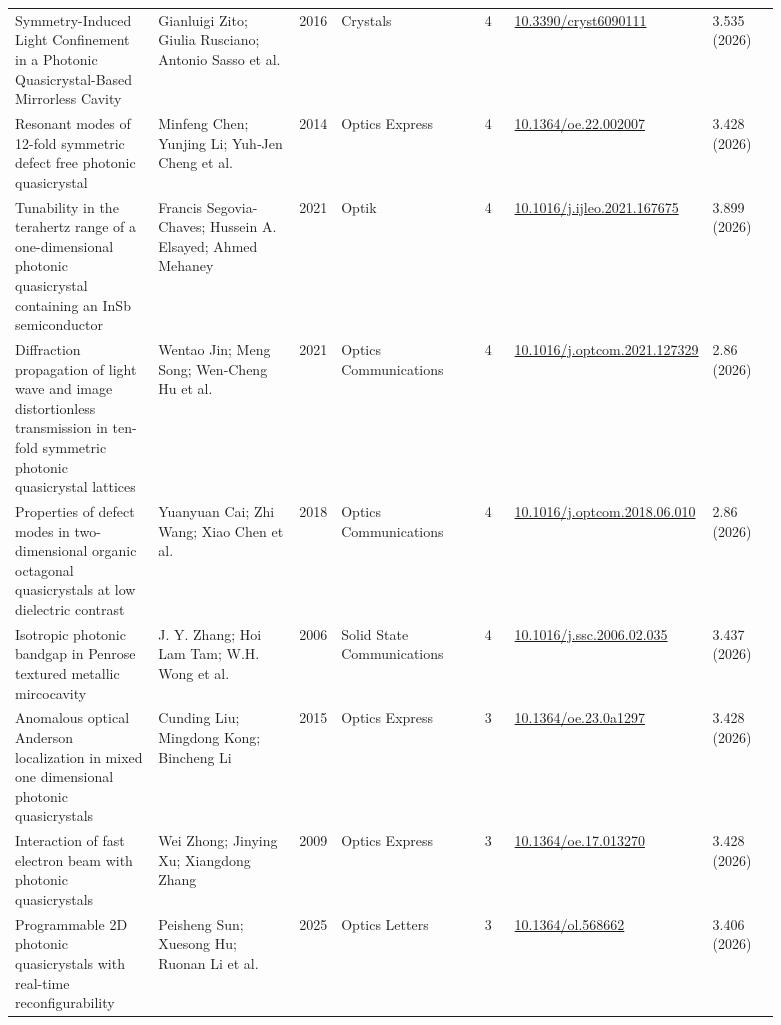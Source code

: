 \documentclass[10pt,a4paper]{article}
\begin{document}
{\begin{longtable}{p{0.192\linewidth}p{0.192\linewidth}p{0.043\linewidth}p{0.192\linewidth}p{0.043\linewidth}p{0.132\linewidth}p{0.096\linewidth}}
Symmetry-Induced Light Confinement in a Photonic Quasicrystal-Based Mirrorless Cavity & Gianluigi Zito; Giulia Rusciano; Antonio Sasso et al. & 2016 & Crystals & 4 & \href{https://doi.org/10.3390/cryst6090111}{10.3390/cryst6090111} & 3.535 (2026) \\
Resonant modes of 12-fold symmetric defect free photonic quasicrystal & Minfeng Chen; Yunjing Li; Yuh‐Jen Cheng et al. & 2014 & Optics Express & 4 & \href{https://doi.org/10.1364/oe.22.002007}{10.1364/oe.22.002007} & 3.428 (2026) \\
Tunability in the terahertz range of a one-dimensional photonic quasicrystal containing an InSb semiconductor & Francis Segovia-Chaves; Hussein A. Elsayed; Ahmed Mehaney & 2021 & Optik & 4 & \href{https://doi.org/10.1016/j.ijleo.2021.167675}{10.1016/j.ijleo.2021.167675} & 3.899 (2026) \\
Diffraction propagation of light wave and image distortionless transmission in ten-fold symmetric photonic quasicrystal lattices & Wentao Jin; Meng Song; Wen‐Cheng Hu et al. & 2021 & Optics Communications & 4 & \href{https://doi.org/10.1016/j.optcom.2021.127329}{10.1016/j.optcom.2021.127329} & 2.86 (2026) \\
Properties of defect modes in two-dimensional organic octagonal quasicrystals at low dielectric contrast & Yuanyuan Cai; Zhi Wang; Xiao Chen et al. & 2018 & Optics Communications & 4 & \href{https://doi.org/10.1016/j.optcom.2018.06.010}{10.1016/j.optcom.2018.06.010} & 2.86 (2026) \\
Isotropic photonic bandgap in Penrose textured metallic mircocavity & J. Y. Zhang; Hoi Lam Tam; W.H. Wong et al. & 2006 & Solid State Communications & 4 & \href{https://doi.org/10.1016/j.ssc.2006.02.035}{10.1016/j.ssc.2006.02.035} & 3.437 (2026) \\
Anomalous optical Anderson localization in mixed one dimensional photonic quasicrystals & Cunding Liu; Mingdong Kong; Bincheng Li & 2015 & Optics Express & 3 & \href{https://doi.org/10.1364/oe.23.0a1297}{10.1364/oe.23.0a1297} & 3.428 (2026) \\
Interaction of fast electron beam with photonic quasicrystals & Wei Zhong; Jinying Xu; Xiangdong Zhang & 2009 & Optics Express & 3 & \href{https://doi.org/10.1364/oe.17.013270}{10.1364/oe.17.013270} & 3.428 (2026) \\
Programmable 2D photonic quasicrystals with real-time reconfigurability & Peisheng Sun; Xuesong Hu; Ruonan Li et al. & 2025 & Optics Letters & 3 & \href{https://doi.org/10.1364/ol.568662}{10.1364/ol.568662} & 3.406 (2026) \\

\end{longtable}}
\end{document}
